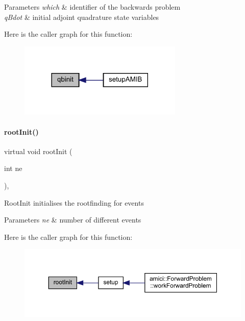 \begin{DoxyParams}{Parameters}
{\em which} & identifier of the backwards problem \\
\hline
{\em q\+Bdot} & initial adjoint quadrature state variables \\
\hline
\end{DoxyParams}
Here is the caller graph for this function\+:
\nopagebreak
\begin{figure}[H]
\begin{center}
\leavevmode
\includegraphics[width=221pt]{classamici_1_1_solver_a57c1900d556ab878f5fad94b4fcd1abd_icgraph}
\end{center}
\end{figure}
\mbox{\label{classamici_1_1_solver_a0bb31b3b358751d4447199e2732db932}} 
\paragraph{\texorpdfstring{root\+Init()}{rootInit()}}
{\footnotesize\ttfamily virtual void root\+Init (\begin{DoxyParamCaption}\item[{int}]{ne }\end{DoxyParamCaption})\hspace{0.3cm}{\ttfamily [protected]}, {}}

Root\+Init initialises the rootfinding for events


\begin{DoxyParams}{Parameters}
{\em ne} & number of different events \\
\hline
\end{DoxyParams}
Here is the caller graph for this function\+:
\nopagebreak
\begin{figure}[H]
\begin{center}
\leavevmode
\includegraphics[width=350pt]{classamici_1_1_solver_a0bb31b3b358751d4447199e2732db932_icgraph}
\end{center}
\end{figure}
\mbox{\label{classamici_1_1_solver_a9e5cc83868435443926cde99c1a1d864}} 
